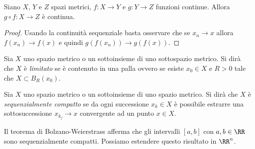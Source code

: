 \begin{theorem}%
  \label{th:continuita_funzione_composta_metrico}%
Siano $X$, $Y$ e $Z$ spazi metrici, $f\colon X\to Y$ 
e $g\colon Y\to Z$ funzioni continue. 
Allora $g\circ f\colon X\to Z$ è continua.
\end{theorem}
\begin{proof}
  Usando la continuità sequenziale basta osservare che 
  se $x_n\to x$ allora $f(x_n)\to f(x)$ e quindi $g(f(x_n))\to g(f(x))$.
\end{proof}

\begin{definition}%
  \label{def:spazio_limitato}%
\mymark{*}%
Sia $X$ uno spazio metrico o un sottoinsieme di uno sottospazio metrico. Si dirà che $X$ è
\emph{limitato}%
 se è contenuto in una palla ovvero se
esiste $x_0\in X$ e $R>0$ tale che $X\subset B_R(x_0)$.
\end{definition}

\begin{definition}%
  \label{def:sequenzialmente_compatto}%
\mymark{**}%
Sia $X$ uno spazio metrico o un sottoinsieme di uno
spazio metrico. Si dirà che $X$ è
\emph{sequenzialmente compatto}%
 se da ogni
successione $x_k \in X$ è possibile estrarre una sottosuccessione $x_{k_j}\to x$
convergente ad un punto $x\in X$.
\end{definition}

Il teorema di Bolzano-Weierstrass afferma che gli intervalli $[a,b]$ con
$a,b\in \RR$ sono sequenzialmente compatti. 
Possiamo estendere questo risultato in $\RR^n$.

